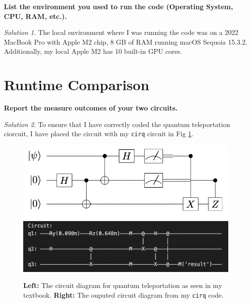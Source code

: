 \documentclass[a4paper,12pt]{article}
\theoremstyle{definition}
\theoremstyle{remark}
\newtheorem*{solution}{Solution}
\begin{document}
	{\bf List the environment you used to run the code (Operating System, CPU, RAM, etc.). } 
	
	\begin{solution}
		The local environment where I was running the code was on a 2022 MacBook Pro with Apple M2 chip, 8 GB of RAM running macOS Sequoia 15.3.2.  Additionally, my local Apple M2 has 10 built-in GPU cores.
	\end{solution}
	
	\section{Runtime Comparison}
	\textbf{Report the measure outcomes of your two circuits.}
	\begin{solution}
		To ensure that I have correctly coded the quantum teleportation ciorcuit, I have placed the circuit with my \texttt{cirq} circuit in Fig \ref{fig:compare}.
		\begin{figure}[h]
			\centering
			\includegraphics[width=0.40\linewidth]{QTCirc}
			\hspace{1cm}
			\includegraphics[width=0.40\linewidth]{CirqCirc}
			\caption{\textbf{Left:} The circuit diagram for quantum teleportation as seen in my textbook. \textbf{Right:} The ouputed circuit diagram from my \texttt{cirq} code. }
			\label{fig:compare}
		\end{figure}
		

\end{solution}
\end{document}
